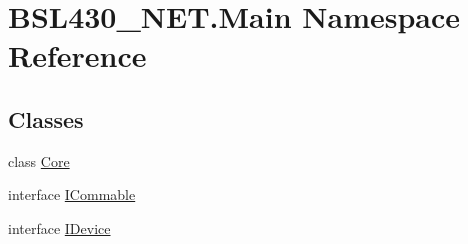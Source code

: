 \hypertarget{namespace_b_s_l430___n_e_t_1_1_main}{}\section{B\+S\+L430\+\_\+\+N\+E\+T.\+Main Namespace Reference}
\label{namespace_b_s_l430___n_e_t_1_1_main}
\subsection*{Classes}
\begin{DoxyCompactItemize}
\item 
class \mbox{\hyperlink{class_b_s_l430___n_e_t_1_1_main_1_1_core}{Core}}
\item 
interface \mbox{\hyperlink{interface_b_s_l430___n_e_t_1_1_main_1_1_i_commable}{I\+Commable}}
\item 
interface \mbox{\hyperlink{interface_b_s_l430___n_e_t_1_1_main_1_1_i_device}{I\+Device}}
\end{DoxyCompactItemize}
